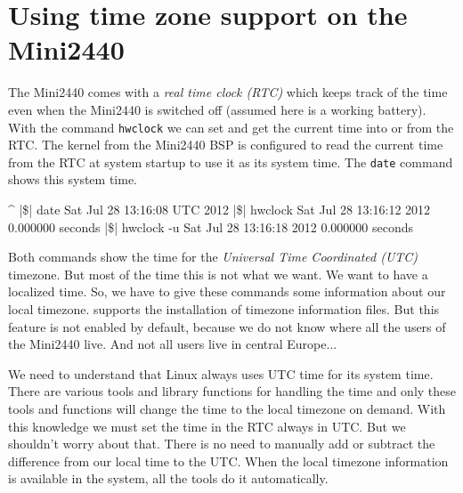 %
%
%
%
%
%
%
\section{Using time zone support on the Mini2440}	\label{sec:timezone}

The Mini2440 comes with a \textit{real time clock (RTC)} which keeps track of
the time even when the Mini2440 is switched off (assumed here is a working
battery). With the command \texttt{hwclock} we can set and get the current
time into or from the RTC. The kernel from the Mini2440 BSP is configured to
read the current time from the RTC at system startup to use it as its system
time. The \texttt{date} command shows this system time.

\begin{ptxshell}[escapechar=|]{^}
|\$| date
Sat Jul 28 13:16:08 UTC 2012
|\$| hwclock
Sat Jul 28 13:16:12 2012  0.000000 seconds
|\$| hwclock -u
Sat Jul 28 13:16:18 2012  0.000000 seconds
\end{ptxshell}

Both commands show the time for the \textit{Universal Time Coordinated (UTC)}
timezone. But most of the time this is not what we want. We want to have a
localized time. So, we have to give these commands some information about our
local timezone. \ptxdist{} supports the installation of timezone information
files. But this feature is not enabled by default, because we do not know where
all the users of the Mini2440 live. And not all users live in central
Europe...

We need to understand that Linux always uses UTC time for its system time.
There are various tools and library functions for handling
the time and only these tools and functions will change the time to the local
timezone on demand.
With this knowledge we must set the time in the RTC always in UTC. But we
shouldn't worry about that. There is no need to manually add or subtract the
difference from our local time to the UTC. When the local timezone information
is available in the system, all the tools do it automatically.

